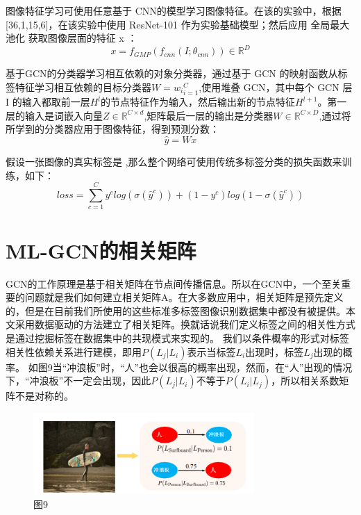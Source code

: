 图像特征学习可使用任意基于 CNN的模型学习图像特征。在该的实验中，根据[36,1,15,6]，在该实验中使用 ResNet-101 作为实验基础模型；然后应用 全局最大池化 获取图像层面的特征 x ：
\begin{equation}
\label{dscNoStgProof0}
x = f_{GMP}(f_{cnn}(I;\theta_{cnn}))\in \mathbb{R}^D
\end{equation}

基于GCN的分类器学习相互依赖的对象分类器，通过基于 GCN 的映射函数从标签特征学习相互依赖的目标分类器$W={w_i}_{i=1}^C$,使用堆叠 GCN，其中每个 GCN 层 I 的输入都取前一层$H^l$的节点特征作为输入，然后输出新的节点特征$H^{l+1}$。第一层的输入是词嵌入向量$Z\in \mathbb{R}^{C\times d}$,矩阵最后一层的输出是分类器$W\in \mathbb{R}^{C\times D}$,通过将所学到的分类器应用于图像特征，得到预测分数：
\begin{equation}
\label{dscNoStgProof0}
\hat{y} = Wx
\end{equation}

假设一张图像的真实标签是 ,那么整个网络可使用传统多标签分类的损失函数来训练，如下：
\begin{equation}
\label{dscNoStgProof0}
loss = \sum_{c=1}^C y^c log(\sigma(\hat{y}^c))+(1-y^c)log(1-\sigma(\hat{y}^c))
\end{equation}

\section{ML-GCN的相关矩阵}
GCN的工作原理是基于相关矩阵在节点间传播信息。所以在GCN中，一个至关重要的问题就是我们如何建立相关矩阵A。在大多数应用中，相关矩阵是预先定义的，但是在目前我们所使用的这些标准多标签图像识别数据集中都没有被提供。本文采用数据驱动的方法建立了相关矩阵。换就话说我们定义标签之间的相关性方式是通过挖掘标签在数据集中的共现模式来实现的。
我们以条件概率的形式对标签相关性依赖关系进行建模，即用$P(L_j|L_i)$表示当标签$L_i$出现时，标签$L_j$出现的概率。 如图9当“冲浪板”时，“人”也会以很高的概率出现，然而，在“人”出现的情况下，“冲浪板”不一定会出现，因此$P(L_j|L_i)$不等于$P(L_i|L_j)$，所以相关系数矩阵不是对称的。

\begin{figure}[htbp!]
	\centering
	\includegraphics[width=0.75\textwidth]{figures/p3-2.png}
	\caption{图9}\label{fig:pic9}
	\vspace{-1em}
\end{figure}


